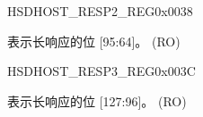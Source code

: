 \begin{register}{H}{SDHOST\_RESP2\_REG}{0x0038}\label{regdesc:SDHOSTRESP2REG}
%
\regnewline%
\begin{regdesc}\begin{reglist}
\label{fielddesc:SDHOSTRESPONSE2REG}\item [SDHOST\_RESPONSE2\_REG] 表示长响应的位 [95:64]。 (RO)
\end{reglist}\end{regdesc}
\end{register}


\begin{register}{H}{SDHOST\_RESP3\_REG}{0x003C}\label{regdesc:SDHOSTRESP3REG}
%
\regnewline%
\begin{regdesc}\begin{reglist}
\label{fielddesc:SDHOSTRESPONSE3REG}\item [SDHOST\_RESPONSE3\_REG] 表示长响应的位 [127:96]。 (RO)
\end{reglist}\end{regdesc}
\end{register}


